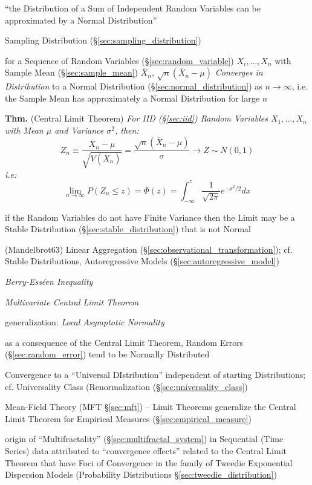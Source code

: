 ``the Distribution of a Sum of Independent Random Variables can be approximated
by a Normal Distribution''

\fist Sampling Distribution (\S\ref{sec:sampling_distribution})

for a Sequence of Random Variables (\S\ref{sec:random_variable})
$X_i, \ldots, X_n$ with Sample Mean (\S\ref{sec:sample_mean})
$\overline{X}_n$, $\sqrt{n}(\overline{X}_n - \mu)$
\emph{Converges in Distribution} to a Normal Distribution
(\S\ref{sec:normal_distribution}) as $n \to \infty$, i.e. the Sample
Mean has approximately a Normal Distribution for large $n$

\textbf{Thm.} (Central Limit Theorem) \emph{For IID (\S\ref{sec:iid}) Random
  Variables $X_1, \ldots, X_n$ with Mean $\mu$ and Variance $\sigma^2$, then:
  \[
    Z_n \equiv \frac{\overline{X}_n - \mu}{\sqrt{V(\overline{X}_n)}} =
      \frac{\sqrt{n}(\overline{X}_n - \mu)}{\sigma} \to Z \sim N(0,1)
  \]
  i.e:
  \[
    \lim_{n\to\infty} P(Z_n \leq z) = \Phi(z) =
      \int_{-\infty}^z \frac{1}{\sqrt{2\pi}}e^{-x^2/2} dx
  \]
}

\fist if the Random Variables do not have Finite Variance then the Limit may be
a Stable Distribution (\S\ref{sec:stable_distribution}) that is not Normal

(Mandelbrot63) Linear Aggregation (\S\ref{sec:observational_transformation});
cf. Stable Distributions, Autoregressive Models
(\S\ref{sec:autoregressive_model})

\emph{Berry-Ess\'een Inequality}

\emph{Multivariate Central Limit Theorem}

generalization: \emph{Local Asymptotic Normality}

as a consequence of the Central Limit Theorem, Random Errors
(\S\ref{sec:random_error}) tend to be Normally Distributed

\fist Convergence to a ``Universal DIstribution'' independent of starting
Distributions; cf. Universality Class (Renormalization
(\S\ref{sec:universality_class})

\fist Mean-Field Theory (MFT \S\ref{sec:mft}) -- Limit Theorems generalize the
Central Limit Theorem for Empirical Measures (\S\ref{sec:empirical_measure})

\fist origin of ``Multifractality'' (\S\ref{sec:multifractal_system}) in
Sequential (Time Series) data attributed to ``convergence effects'' related to
the Central Limit Theorem that have Foci of Convergence in the family of Tweedie
Exponential Dispersion Models (Probability Distributions
\S\ref{sec:tweedie_distribution})

